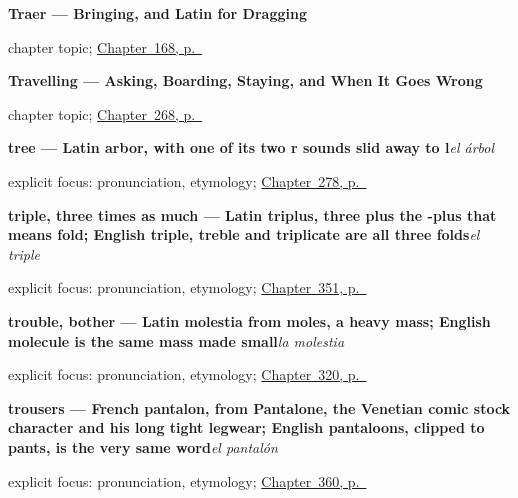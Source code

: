 \noindent\begin{minipage}[t]{\linewidth}
\raggedright
\textbf{Traer --- Bringing, and Latin for Dragging}\par
\footnotesize chapter topic; \hyperref[ch:spanish-traer]{Chapter~168, p.~\pageref*{ch:spanish-traer}}
\end{minipage}\par\smallskip

\noindent\begin{minipage}[t]{\linewidth}
\raggedright
\textbf{Travelling --- Asking, Boarding, Staying, and When It Goes Wrong}\par
\footnotesize chapter topic; \hyperref[ch:viajar]{Chapter~268, p.~\pageref*{ch:viajar}}
\end{minipage}\par\smallskip

\noindent\begin{minipage}[t]{\linewidth}
\raggedright
\textbf{tree — Latin arbor, with one of its two r sounds slid away to l}\enspace\emph{el árbol}\par
\footnotesize explicit focus: pronunciation, etymology; \hyperref[ch:al-aire-libre]{Chapter~278, p.~\pageref*{ch:al-aire-libre}}
\end{minipage}\par\smallskip

\noindent\begin{minipage}[t]{\linewidth}
\raggedright
\textbf{triple, three times as much — Latin triplus, three plus the -plus that means fold; English triple, treble and triplicate are all three folds}\enspace\emph{el triple}\par
\footnotesize explicit focus: pronunciation, etymology; \hyperref[ch:cien-y-la-cantidad]{Chapter~351, p.~\pageref*{ch:cien-y-la-cantidad}}
\end{minipage}\par\smallskip

\noindent\begin{minipage}[t]{\linewidth}
\raggedright
\textbf{trouble, bother — Latin molestia from moles, a heavy mass; English molecule is the same mass made small}\enspace\emph{la molestia}\par
\footnotesize explicit focus: pronunciation, etymology; \hyperref[ch:favor-y-culpa]{Chapter~320, p.~\pageref*{ch:favor-y-culpa}}
\end{minipage}\par\smallskip

\noindent\begin{minipage}[t]{\linewidth}
\raggedright
\textbf{trousers — French pantalon, from Pantalone, the Venetian comic stock character and his long tight legwear; English pantaloons, clipped to pants, is the very same word}\enspace\emph{el pantalón}\par
\footnotesize explicit focus: pronunciation, etymology; \hyperref[ch:la-ropa-y-el-zapato]{Chapter~360, p.~\pageref*{ch:la-ropa-y-el-zapato}}
\end{minipage}\par\smallskip


